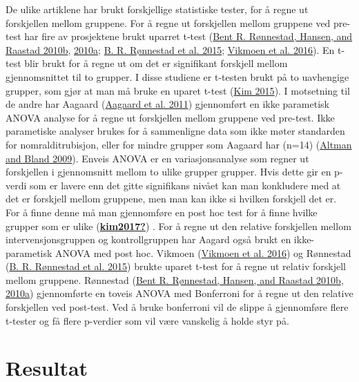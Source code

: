 \documentclass[
]{book}
\begin{document}
De ulike artiklene har brukt forskjellige statistiske tester, for å
regne ut forskjellen mellom gruppene. For å regne ut forskjellen mellom
gruppene ved pre-test har fire av prosjektene brukt uparret t-test
(\protect\hyperlink{ref-ruxf8nnestad2010a}{Bent R. Rønnestad, Hansen,
and Raastad 2010b}, \protect\hyperlink{ref-ruxf8nnestad2010b}{2010a};
\protect\hyperlink{ref-ruxf8nnestad2015}{B. R. Rønnestad et al. 2015};
\protect\hyperlink{ref-vikmoen2016}{Vikmoen et al. 2016}). En t-test
blir brukt for å regne ut om det er signifikant forskjell mellom
gjennomsnittet til to grupper. I disse studiene er t-testen brukt på to
uavhengige grupper, som gjør at man må bruke en uparet t-test
(\protect\hyperlink{ref-kim2015}{Kim 2015}). I motsetning til de andre
har Aagaard (\protect\hyperlink{ref-aagaard2011}{Aagaard et al. 2011})
gjennomført en ikke parametisk ANOVA analyse for å regne ut forskjellen
mellom gruppene ved pre-test. Ikke parametiske analyser brukes for å
sammenligne data som ikke møter standarden for nomralditrubisjon, eller
for mindre grupper som Aagaard har (n=14)
(\protect\hyperlink{ref-altman2009}{Altman and Bland 2009}). Enveis
ANOVA er en variasjonsanalyse som regner ut forskjellen i gjennomsnitt
mellom to ulike grupper grupper. Hvis dette gir en p-verdi som er lavere
enn det gitte signifikans nivået kan man konkludere med at det er
forskjell mellom gruppene, men man kan ikke si hvilken forskjell det er.
For å finne denne må man gjennomføre en post hoc test for å finne hvilke
grupper som er ulike
(\protect\hyperlink{ref-kim2017}{\textbf{kim2017?}}) . For å regne ut
den relative forskjellen mellom intervensjonsgruppen og kontrollgruppen
har Aagard også brukt en ikke-parametisk ANOVA med post hoc. Vikmoen
(\protect\hyperlink{ref-vikmoen2016}{Vikmoen et al. 2016}) og Rønnestad
(\protect\hyperlink{ref-ruxf8nnestad2015}{B. R. Rønnestad et al. 2015})
brukte uparet t-test for å regne ut relativ forskjell mellom gruppene.
Rønnestad (\protect\hyperlink{ref-ruxf8nnestad2010a}{Bent R. Rønnestad,
Hansen, and Raastad 2010b},
\protect\hyperlink{ref-ruxf8nnestad2010b}{2010a}) gjennomførte en toveis
ANOVA med Bonferroni for å regne ut den relative forskjellen ved
post-test. Ved å bruke bonferroni vil de slippe å gjennomføre flere
t-tester og få flere p-verdier som vil være vanskelig å holde styr på.

\hypertarget{resultat}{%
\section{Resultat}\label{resultat}}
\end{document}

